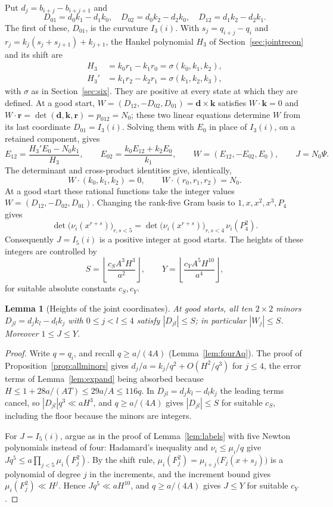 \documentclass[11pt]{article}
\newtheorem{lemma}[theorem]{Lemma}
\theoremstyle{definition}
\theoremstyle{remark}
\begin{document}
Put $d_j=b_{i+j}-b_{i+j+1}$ and
\[
 D_{01}=d_0k_1-d_1k_0,\quad D_{02}=d_0k_2-d_2k_0,\quad
 D_{12}=d_1k_2-d_2k_1.
\]
The first of these, $D_{01}$, is the curvature $I_3(i)$. With $s_j=q_{i+j}-q_i$ and
$r_j=k_j(s_j+s_{j+1})+k_{j+1}$, the Hankel polynomial $H_3$ of Section~\ref{sec:jointrecon}
and its shift are
\begin{align*}
 H_3&=k_0r_1-k_1r_0=\sigma(k_0,k_1,k_2),\\
 H_3'&=k_1r_2-k_2r_1=\sigma(k_1,k_2,k_3),
\end{align*}
with $\sigma$ as in Section~\ref{sec:six}. They are positive at every state at which they are
defined. At a good start, $W=(D_{12},-D_{02},D_{01})=\mathbf d\times\mathbf k$ satisfies
$W\cdot\mathbf k=0$ and $W\cdot\mathbf r=\det(\mathbf d,\mathbf k,\mathbf r)=p_{012}=N_0$;
these two linear equations determine $W$ from its last coordinate $D_{01}=I_3(i)$.
Solving them with $E_0$ in place of $I_3(i)$, on a retained component, gives
\[
 E_{12}=\frac{H_3'E_0-N_0k_1}{H_3},\qquad
 E_{02}=\frac{k_0E_{12}+k_2E_0}{k_1},\qquad
 W=(E_{12},-E_{02},E_0),\qquad J=N_0\Psi.
\]
The determinant and cross-product identities give, identically,
\begin{equation}\label{eq:jointdot}
 W\cdot(k_0,k_1,k_2)=0,\qquad W\cdot(r_0,r_1,r_2)=N_0.
\end{equation}
At a good start these rational functions take the integer values
$W=(D_{12},-D_{02},D_{01})$. Changing
the rank-five Gram basis to $1,x,x^2,x^3,P_4$ gives
\[
 \det\bigl(\nu_i(x^{r+s})\bigr)_{r,s<5}=\det\bigl(\nu_i(x^{r+s})\bigr)_{r,s<4}\,\nu_i(P_4^2).
\]
Consequently $J=I_5(i)$ is a positive integer at good starts. The heights of these
integers are controlled by
\[
 S=\left\lfloor\frac{c_S A^3H^3}{a^2}\right\rfloor,\qquad
 Y=\left\lfloor\frac{c_Y A^5H^{10}}{a^4}\right\rfloor,
\]
for suitable absolute constants $c_S,c_Y$.

\begin{lemma}[Heights of the joint coordinates]\label{lem:jointheights}
At good starts, all ten $2\times2$ minors $D_{jl}=d_jk_l-d_lk_j$ with $0\le j<l\le4$ satisfy
$|D_{jl}|\le S$; in particular $|W_j|\le S$. Moreover $1\le J\le Y$.
\end{lemma}
\begin{proof}
Write $q=q_i$, and recall $q\ge a/(4A)$ (Lemma~\ref{lem:fourAq}). The proof of
Proposition~\ref{prop:allminors} gives $d_j/a=k_j/q^2+O(H^2/q^3)$ for $j\le4$,
the error terms of Lemma~\ref{lem:expand} being absorbed because
$H\le1+28a/(AT)\le29a/A\le116q$.
In $D_{jl}=d_jk_l-d_lk_j$ the leading terms cancel, so $|D_{jl}|q^3\ll aH^3$, and
$q\ge a/(4A)$ gives $|D_{jl}|\le S$ for suitable $c_S$, including the floor because the
minors are integers.

For $J=I_5(i)$, argue as in the proof of Lemma~\ref{lem:labels} with five Newton polynomials
instead of four: Hadamard's inequality and $\nu_i\le\mu_i/q$ give
$Jq^5\le a\prod_{j<5}\mu_i(F_j^2)$. By the shift rule,
$\mu_i(F_j^2)=\mu_{i+j}\bigl(F_j(x+s_j)\bigr)$ is a polynomial of degree $j$ in the increments, and
the increment bound gives $\mu_i(F_j^2)\ll H^j$. Hence $Jq^5\ll aH^{10}$, and $q\ge a/(4A)$
gives $J\le Y$ for suitable $c_Y$.
\end{proof}
\end{document}
